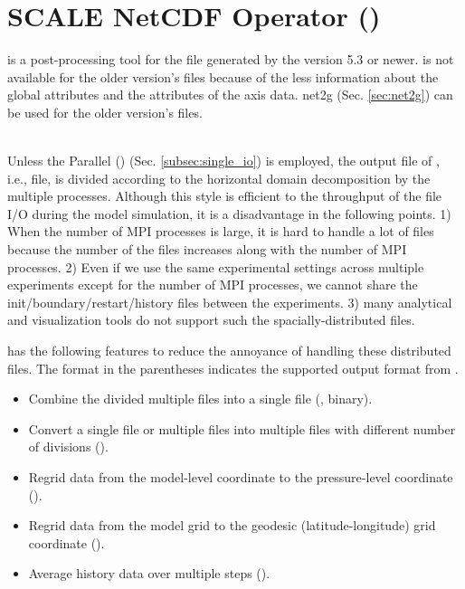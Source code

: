 \section{SCALE NetCDF Operator (\sno)} \label{sec:sno}

 \hrulefill

\sno is a post-processing tool for the \scalenetcdf file generated by the \scalelib version 5.3 or newer.
\sno is not available for the older version's \scalenetcdf files because of the less information about the global attributes and the attributes of the axis data.
net2g (Sec. \ref{sec:net2g}) can be used for the older version's \scalenetcdf files.

\hrulefill\\


Unless the Parallel \netcdf (\pnetcdf) (Sec. \ref{subsec:single_io}) is employed,
the output file of \scalerm, i.e., \scalenetcdf file, is divided according to the horizontal domain decomposition by the multiple processes.
Although this style is efficient to the throughput of the file I/O during the model simulation, it is a disadvantage in the following points.
%
1) When the number of MPI processes is large, it is hard to handle a lot of files because the number of the files increases along with the number of MPI processes.
2) Even if we use the same experimental settings across multiple experiments except for the number of MPI processes, we cannot share the init/boundary/restart/history files between the experiments.
3) many analytical and visualization tools do not support such the spacially-distributed files.


\sno has the following features to reduce the annoyance of handling these distributed files.
The format in the parentheses indicates the supported output format from \sno.
\begin{itemize}
 \item Combine the divided multiple files into a single file (\scalenetcdf, \grads binary).
 \item Convert a single file or multiple files into multiple files with different number of divisions  (\scalenetcdf).
 \item Regrid data from the model-level coordinate to the pressure-level coordinate (\scalenetcdf).
 \item Regrid data from the model grid to the geodesic (latitude-longitude) grid coordinate (\scalenetcdf).
 \item Average history data over multiple steps (\scalenetcdf).
\end{itemize}



